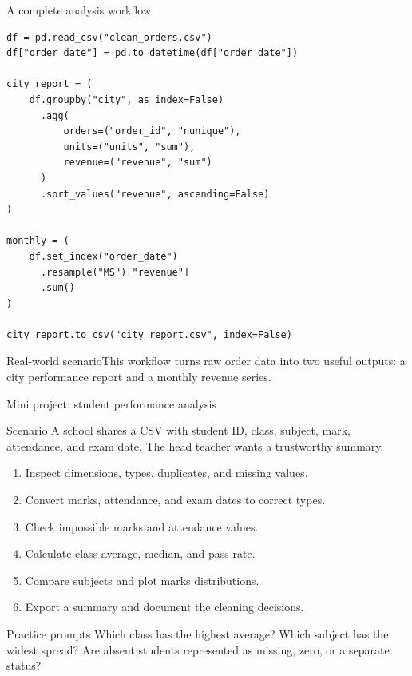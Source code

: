 \documentclass[aspectratio=169,10pt]{beamer}
\newcommand{\scenario}[1]{\begin{block}{Real-world scenario}#1\end{block}}
\begin{document}
\begin{frame}[fragile]{A complete analysis workflow}
\begin{lstlisting}
df = pd.read_csv("clean_orders.csv")
df["order_date"] = pd.to_datetime(df["order_date"])

city_report = (
    df.groupby("city", as_index=False)
      .agg(
          orders=("order_id", "nunique"),
          units=("units", "sum"),
          revenue=("revenue", "sum")
      )
      .sort_values("revenue", ascending=False)
)

monthly = (
    df.set_index("order_date")
      .resample("MS")["revenue"]
      .sum()
)

city_report.to_csv("city_report.csv", index=False)
\end{lstlisting}
\scenario{This workflow turns raw order data into two useful outputs: a city performance report and a monthly revenue series.}
\end{frame}

\begin{frame}[fragile]{Mini project: student performance analysis}
\begin{block}{Scenario}
A school shares a CSV with student ID, class, subject, mark, attendance, and exam date. The head teacher wants a trustworthy summary.
\end{block}
\begin{enumerate}
\item Inspect dimensions, types, duplicates, and missing values.
\item Convert marks, attendance, and exam dates to correct types.
\item Check impossible marks and attendance values.
\item Calculate class average, median, and pass rate.
\item Compare subjects and plot marks distributions.
\item Export a summary and document the cleaning decisions.
\end{enumerate}
\begin{block}{Practice prompts}
Which class has the highest average? Which subject has the widest spread? Are absent students represented as missing, zero, or a separate status?
\end{block}
\end{frame}
\end{document}
